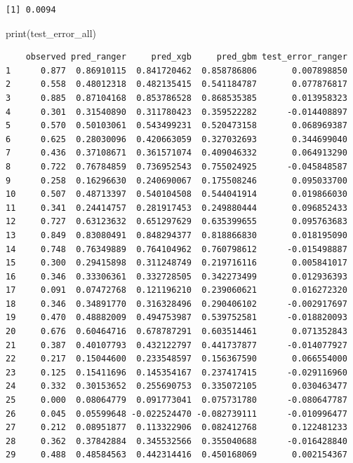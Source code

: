 \documentclass[
  letterpaper,
  DIV=11,
  numbers=noendperiod]{scrartcl}
\newenvironment{Shaded}{\begin{snugshade}}{\end{snugshade}}
\newcommand{\FunctionTok}[1]{\textcolor[rgb]{0.28,0.35,0.67}{#1}}
\newcommand{\NormalTok}[1]{\textcolor[rgb]{0.00,0.23,0.31}{#1}}
\begin{document}
\begin{verbatim}
[1] 0.0094
\end{verbatim}

\begin{Shaded}
\begin{Highlighting}[]
\FunctionTok{print}\NormalTok{(test\_error\_all)}
\end{Highlighting}
\end{Shaded}

\begin{verbatim}
    observed pred_ranger     pred_xgb     pred_gbm test_error_ranger
1      0.877  0.86910115  0.841720462  0.858786806       0.007898850
2      0.558  0.48012318  0.482135415  0.541184787       0.077876817
3      0.885  0.87104168  0.853786528  0.868535385       0.013958323
4      0.301  0.31540890  0.311780423  0.359522282      -0.014408897
5      0.570  0.50103061  0.543499231  0.520473158       0.068969387
6      0.625  0.28030096  0.420663059  0.327032693       0.344699040
7      0.436  0.37108671  0.361571074  0.409046332       0.064913290
8      0.722  0.76784859  0.736952543  0.755024925      -0.045848587
9      0.258  0.16296630  0.240690067  0.175508246       0.095033700
10     0.507  0.48713397  0.540104508  0.544041914       0.019866030
11     0.341  0.24414757  0.281917453  0.249880444       0.096852433
12     0.727  0.63123632  0.651297629  0.635399655       0.095763683
13     0.849  0.83080491  0.848294377  0.818866830       0.018195090
14     0.748  0.76349889  0.764104962  0.760798612      -0.015498887
15     0.300  0.29415898  0.311248749  0.219716116       0.005841017
16     0.346  0.33306361  0.332728505  0.342273499       0.012936393
17     0.091  0.07472768  0.121196210  0.239060621       0.016272320
18     0.346  0.34891770  0.316328496  0.290406102      -0.002917697
19     0.470  0.48882009  0.494753987  0.539752581      -0.018820093
20     0.676  0.60464716  0.678787291  0.603514461       0.071352843
21     0.387  0.40107793  0.432122797  0.441737877      -0.014077927
22     0.217  0.15044600  0.233548597  0.156367590       0.066554000
23     0.125  0.15411696  0.145354167  0.237417415      -0.029116960
24     0.332  0.30153652  0.255690753  0.335072105       0.030463477
25     0.000  0.08064779  0.091773041  0.075731780      -0.080647787
26     0.045  0.05599648 -0.022524470 -0.082739111      -0.010996477
27     0.212  0.08951877  0.113322906  0.082412768       0.122481233
28     0.362  0.37842884  0.345532566  0.355040688      -0.016428840
29     0.488  0.48584563  0.442314416  0.450168069       0.002154367

\end{verbatim}
\end{document}
